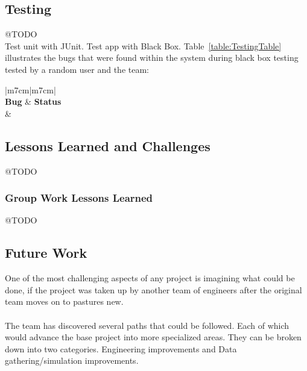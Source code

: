 \documentclass[11pt]{article}
\begin{document}
\subsection{Testing} 
@TODO
\\Test unit with JUnit. Test app with Black Box. 
Table~\ref{table:TestingTable} illustrates the bugs that were found within the system during black box testing tested by a random user and the team:
\begin{center}
	\begin{table}[!htb]
	\begin{tabular}{|m{7cm}|m{7cm}|}
		 \hline
		 \\ 
		\hline 
		 \centering \textbf{Bug} & \textbf{Status}\\\hline
		 &  \\  \hline
		
	\end{tabular}
	\caption{Testing Table}
		\label{table:TestingTable}
	\end{table}
\end{center}

\subsection{Lessons Learned and Challenges} 
@TODO


\subsubsection{Group Work Lessons Learned}
@TODO

	
\subsection{Future Work} 
One of the most challenging aspects of any project is imagining what could be done, if the project was taken up by another team of engineers after the original team moves on to pastures new.
\\~\\
The team has discovered several paths that could be followed. Each of which would advance the base project into more specialized areas.
They can be broken down into two categories. Engineering improvements and Data gathering/simulation improvements.
\end{document}
